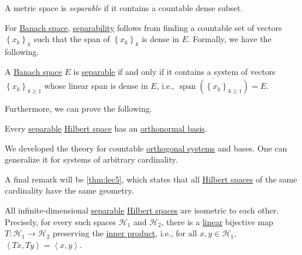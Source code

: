 \begin{definition}[Separable]\label{def:separable}
	A metric space is \emph{separable} if it contains a countable dense subset.
\end{definition}

For \hyperref[def:Banach-space]{Banach space}, \hyperref[def:separable]{separability} follows from finding a countable set of vectors \(\left\{ x_{k}\right\}_k\) such that the span of \(\left\{ x_{k}\right\}_k\) is dense in \(E\). Formally, we have the following.

\begin{lemma}\label{lma:separable-spaces}
	A \hyperref[def:Banach-space]{Banach space} \(E\) is \hyperref[def:separable]{separable} if and only if it contains a system of vectors \(\left\{ x_k \right\} _{k\geq 1}\) whose linear span is dense in \(E\), i.e., \(\overline{\operatorname{span}(\left\{ x_k \right\} _{k\geq 1})} = E\).
\end{lemma}

Furthermore, we can prove the following.

\begin{theorem}
	Every \hyperref[def:separable]{separable} \hyperref[def:Hilbert-space]{Hilbert space} has an \hyperref[def:orthonormal-basis]{orthonormal basis}.
\end{theorem}

\begin{remark}
	We developed the theory for countable \hyperref[def:orthogonal-system]{orthogonal systems} and bases. One can generalize it for systems of arbitrary cardinality.
\end{remark}

A final remark will be \autoref{thm:lec5}, which states that all \hyperref[def:Hilbert-space]{Hilbert spaces} of the same cardinality have the same geometry.

\begin{theorem}\label{thm:lec5}
	All infinite-dimensional \hyperref[def:separable]{separable} \hyperref[def:Hilbert-space]{Hilbert spaces} are isometric to each other. Precisely, for every such spaces \(\mathcal{H} _1\) and \(\mathcal{H} _2\), there is a \hyperref[def:linear-op]{linear} bijective map \(T\colon \mathcal{H} _1 \to \mathcal{H} _2\) preserving the \hyperref[def:inner-product]{inner product}, i.e., for all \(x, y\in \mathcal{H} _1\), \(\left\langle Tx, Ty \right\rangle = \left\langle x, y \right\rangle\).
\end{theorem}

